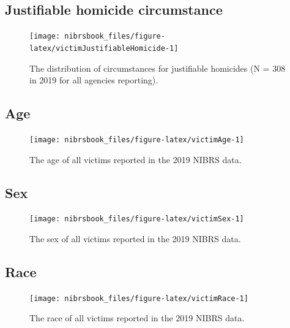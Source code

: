 \documentclass[
  12pt,
  openany]{book}
\begin{document}

\hypertarget{justifiable-homicide-circumstance}{%
\subsection{Justifiable homicide circumstance}\label{justifiable-homicide-circumstance}}

\begin{figure}

{\centering \texttt{[image: nibrsbook\_files/figure-latex/victimJustifiableHomicide-1]} 

}

\caption{The distribution of circumstances for justifiable homicides (N = 308 in 2019 for all agencies reporting).}\label{fig:victimJustifiableHomicide}
\end{figure}

\hypertarget{age-1}{%
\subsection{Age}\label{age-1}}

\begin{figure}

{\centering \texttt{[image: nibrsbook\_files/figure-latex/victimAge-1]} 

}

\caption{The age of all victims reported in the 2019 NIBRS data.}\label{fig:victimAge}
\end{figure}

\hypertarget{sex-1}{%
\subsection{Sex}\label{sex-1}}

\begin{figure}

{\centering \texttt{[image: nibrsbook\_files/figure-latex/victimSex-1]} 

}

\caption{The sex of all victims reported in the 2019 NIBRS data.}\label{fig:victimSex}
\end{figure}

\hypertarget{race-1}{%
\subsection{Race}\label{race-1}}

\begin{figure}

{\centering \texttt{[image: nibrsbook\_files/figure-latex/victimRace-1]} 

}

\caption{The race of all victims reported in the 2019 NIBRS data.}\label{fig:victimRace}
\end{figure}
\end{document}
